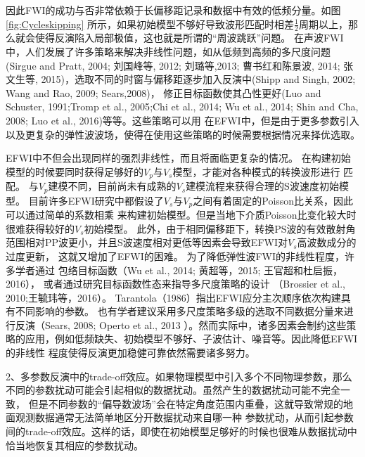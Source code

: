 因此FWI的成功与否非常依赖于长偏移距记录和数据中有效的低频分量。如图\ref{fig:Cycleskipping}
所示，如果初始模型不够好导致波形匹配时相差$\frac{1}{2}$周期以上，那么就会使得反演陷入局部极值，这也就是所谓的“周波跳跃”问题。
在声波FWI中，人们发展了许多策略来解决非线性问题，如从低频到高频的多尺度问题(Sirgue and
Pratt, 2004\cite{sirgue.pratt:2004}; 刘国峰等, 2012\cite{刘国峰2012};
刘璐等,2013\cite{刘璐2013}; 曹书红和陈景波, 2014\cite{曹书红2014}; 
张文生等, 2015\cite{张文生2015})，选取不同的时窗与偏移距逐步加入反演中(Shipp and
Singh, 2002\cite{shipp:2002}; Wang and Rao, 2009\cite{WangEtAl2009}; Sears,2008\cite{sears2008})，
修正目标函数使其凸性更好(Luo and Schuster, 1991\cite{luo1991};Tromp et al.,
2005\cite{tromp2005seismic};Chi
et al., 2014\cite{ChiEtAl2014}; Wu et al., 2014\cite{Wu2014b}; Shin and Cha,
2008\cite{shin.cha:2008}; Luo et al., 2016\cite{Luo2016})等等。这些策略可以用
在EFWI中，但是由于更多参数引入以及更复杂的弹性波波场，使得在使用这些策略的时候需要根据情况来择优选取。

EFWI中不但会出现同样的强烈非线性，而且将面临更复杂的情况。
在构建初始模型的时候要同时获得足够好的$V_p$与$V_s$模型，才能对各种模式的转换波形进行
匹配。
与$V_p$建模不同，目前尚未有成熟的$V_s$建模流程来获得合理的S波速度初始模型。
目前许多EFWI研究中都假设了$V_s$与$V_p$之间有着固定的Poisson比关系，因此可以通过简单的系数相乘
来构建初始模型。但是当地下介质Poisson比变化较大时很难获得较好的$V_s$初始模型。
此外，由于相同偏移距下，转换PS波的有效散射角范围相对PP波更小，并且S波速度相对更低等因素会导致EFWI对$V_s$高波数成分的过度更新，
这就又增加了EFWI的困难。
为了降低弹性波FWI的非线性程度，许多学者通过
包络目标函数（Wu et al., 2014\cite{Wu2014b}; 黄超等，2015\cite{黄超2015};
王官超和杜启振，2016\cite{王官超2016}），
或者通过研究目标函数性态来指导多尺度策略的设计
（Brossier et al., 2010\cite{BrossierEtAl2010};王毓玮等，2016\cite{王毓玮2016}）。
Tarantola（1986）\cite{tarantola:1986}指出EFWI应分主次顺序依次构建具有不同影响的参数。
也有学者建议采用多尺度策略多级的选取不同数据分量来进行反演（Sears, 2008\cite{sears2008}; Operto et al., 2013
\cite{operto2013guided}）。然而实际中，诸多因素会制约这些策略的应用，例如低频缺失、初始模型不够好、子波估计、噪音等。因此降低EFWI的非线性
程度使得反演更加稳健可靠依然需要诸多努力。

2、多参数反演中的trade-off效应。如果物理模型中引入多个不同物理参数，那么不同的参数扰动可能会引起相似的数据扰动。虽然产生的数据扰动可能不完全一致，
但是不同参数的“偏导数波场\cite{pratt1998gauss}”会在特定角度范围内重叠，这就导致常规的地面观测数据通常无法简单地区分开数据扰动来自哪一种
参数扰动，从而引起参数间的trade-off效应。这样的话，即使在初始模型足够好的时候也很难从数据扰动中恰当地恢复其相应的参数扰动。


